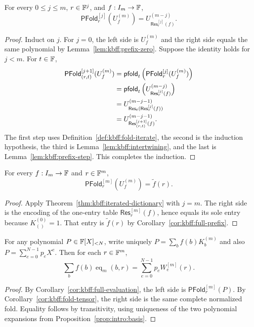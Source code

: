 \begin{theorem}\label{thm:kbff:iterated-dictionary}
For every $0\leq j\leq m$, $r\in\mathbb{F}^j$, and $f:I_m\to\mathbb{F}$,
\[
 \boxed{\mathsf{PFold}^{[j]}_r(U_f^{(m)})
 =U_{\mathsf{Res}^{[j]}_r(f)}^{(m-j)}.}
\]
\end{theorem}
\begin{proof}
Induct on $j$. For $j=0$, the left side is $U_f^{(m)}$ and the right side equals the same polynomial by Lemma~\ref{lem:kbff:prefix-zero}. Suppose the identity holds for $j<m$. For $t\in\mathbb{F}$,
\begin{align*}
 \mathsf{PFold}^{[j+1]}_{(r,t)}(U_f^{(m)})
 &=\mathsf{pfold}_t\left(\mathsf{PFold}^{[j]}_r(U_f^{(m)})\right)\\
 &=\mathsf{pfold}_t\left(U_{\mathsf{Res}^{[j]}_r(f)}^{(m-j)}\right)\\
 &=U_{\mathsf{Res}_t(\mathsf{Res}^{[j]}_r(f))}^{(m-j-1)}\\
 &=U_{\mathsf{Res}^{[j+1]}_{(r,t)}(f)}^{(m-j-1)}.
\end{align*}
The first step uses Definition~\ref{def:kbff:fold-iterate}, the second is the induction hypothesis, the third is Lemma~\ref{lem:kbff:intertwining}, and the last is Lemma~\ref{lem:kbff:prefix-step}. This completes the induction.
\end{proof}

\begin{corollary}\label{cor:kbff:full-evaluation}
For every $f:I_m\to\mathbb{F}$ and $r\in\mathbb{F}^m$,
\[
 \boxed{\mathsf{PFold}^{[m]}_r(U_f^{(m)})=\widetilde f(r).}
\]
\end{corollary}
\begin{proof}
Apply Theorem~\ref{thm:kbff:iterated-dictionary} with $j=m$.
The right side is the encoding of the one-entry table
$\mathsf{Res}^{[m]}_r(f)$, hence equals its sole entry because
$K_{()}^{(0)}=1$. That entry is $\widetilde f(r)$ by Corollary~\ref{cor:kbff:full-prefix}.
\end{proof}

\begin{corollary}\label{cor:kbff:two-functional}
For any polynomial $P\in\mathbb{F}[X]_{<N}$, write uniquely
$P=\sum_bf(b)K_b^{(m)}$ and also $P=\sum_{e=0}^{N-1}p_eX^e$.
Then for each $r\in\mathbb{F}^m$,
\[
 \sum_b f(b)\operatorname{eq}_m(b,r)
 =\sum_{e=0}^{N-1}p_e W_e^{[m]}(r).
\]
\end{corollary}
\begin{proof}
By Corollary~\ref{cor:kbff:full-evaluation}, the left side is
$\mathsf{PFold}^{[m]}_r(P)$. By Corollary~\ref{cor:kbff:fold-tensor}, the right side is the same complete normalized fold. Equality follows by transitivity, using uniqueness of the two polynomial expansions from Proposition~\ref{prop:intro:basis}.
\end{proof}

